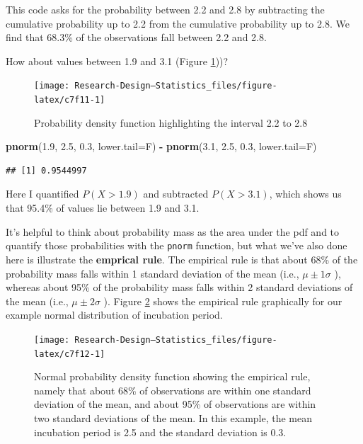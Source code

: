 \documentclass[
]{book}
\newenvironment{Shaded}{\begin{snugshade}}{\end{snugshade}}
\newcommand{\AttributeTok}[1]{\textcolor[rgb]{0.13,0.29,0.53}{#1}}
\newcommand{\FloatTok}[1]{\textcolor[rgb]{0.00,0.00,0.81}{#1}}
\newcommand{\FunctionTok}[1]{\textcolor[rgb]{0.13,0.29,0.53}{\textbf{#1}}}
\newcommand{\NormalTok}[1]{#1}
\newcommand{\SpecialCharTok}[1]{\textcolor[rgb]{0.81,0.36,0.00}{\textbf{#1}}}
\begin{document}
This code asks for the probability between 2.2 and 2.8 by subtracting the cumulative probability up to 2.2 from the cumulative probability up to 2.8. We find that 68.3\% of the observations fall between 2.2 and 2.8.

How about values between 1.9 and 3.1 (Figure \ref{fig:c7f11}))?

\begin{figure}

{\centering \texttt{[image: Research-Design---Statistics\_files/figure-latex/c7f11-1]} 

}

\caption{Probability density function highlighting the interval 2.2 to 2.8}\label{fig:c7f11}
\end{figure}

\begin{Shaded}
\begin{Highlighting}[]
\FunctionTok{pnorm}\NormalTok{(}\FloatTok{1.9}\NormalTok{, }\FloatTok{2.5}\NormalTok{, }\FloatTok{0.3}\NormalTok{, }\AttributeTok{lower.tail=}\NormalTok{F) }\SpecialCharTok{{-}} \FunctionTok{pnorm}\NormalTok{(}\FloatTok{3.1}\NormalTok{, }\FloatTok{2.5}\NormalTok{, }\FloatTok{0.3}\NormalTok{, }\AttributeTok{lower.tail=}\NormalTok{F) }
\end{Highlighting}
\end{Shaded}

\begin{verbatim}
## [1] 0.9544997
\end{verbatim}

Here I quantified \(P(X>1.9)\) and subtracted \(P(X>3.1)\), which shows us that 95.4\% of values lie between 1.9 and 3.1.

It's helpful to think about probability mass as the area under the pdf and to quantify those probabilities with the \texttt{pnorm} function, but what we've also done here is illustrate the \textbf{emprical rule}. The empirical rule is that about 68\% of the probability mass falls within 1 standard deviation of the mean (i.e., \(\mu \pm 1\sigma\) ), whereas about 95\% of the probability mass falls within 2 standard deviations of the mean (i.e., \(\mu \pm 2\sigma\) ). Figure \ref{fig:c7f12} shows the empirical rule graphically for our example normal distribution of incubation period.

\begin{figure}

{\centering \texttt{[image: Research-Design---Statistics\_files/figure-latex/c7f12-1]} 

}

\caption{Normal probability density function showing the empirical rule, namely that about 68\% of observations are within one standard deviation of the mean, and about 95\% of observations are within two standard deviations of the mean. In this example, the mean incubation period is 2.5 and the standard deviation is 0.3.}\label{fig:c7f12}
\end{figure}
\end{document}

